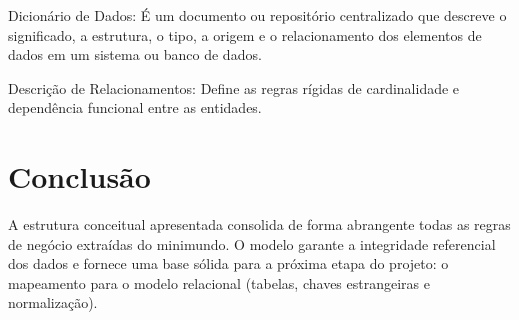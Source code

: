 \documentclass{article}
\begin{document}
Dicionário de Dados: É um documento ou repositório centralizado que descreve o significado, a estrutura, o tipo, a origem e o relacionamento dos elementos de dados em um sistema ou banco de dados.

Descrição de Relacionamentos: Define as regras rígidas de cardinalidade e dependência funcional entre as entidades.

\section{Conclusão}
A estrutura conceitual apresentada consolida de forma abrangente todas as regras de negócio extraídas do minimundo. O modelo garante a integridade referencial dos dados e fornece uma base sólida para a próxima etapa do projeto: o mapeamento para o modelo relacional (tabelas, chaves estrangeiras e normalização).

\newpage
\end{document}
